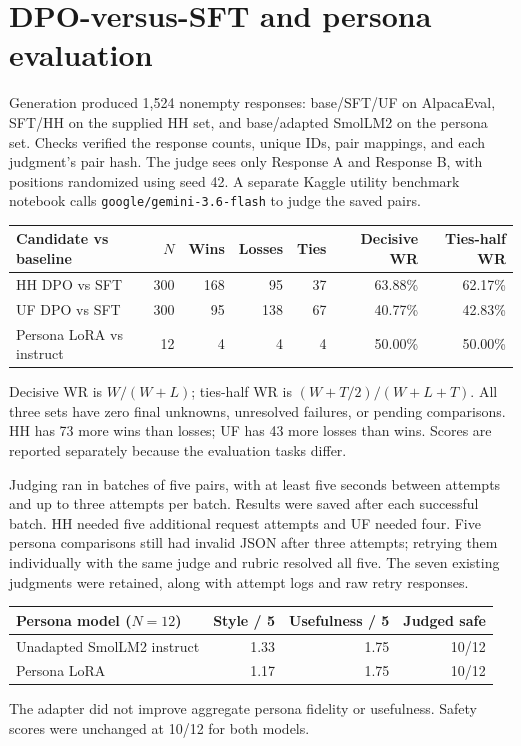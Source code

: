 \documentclass[10pt,a4paper]{article}
\begin{document}
\clearpage
\section{DPO-versus-SFT and persona evaluation}
Generation produced 1,524 nonempty responses: base/SFT/UF on AlpacaEval, SFT/HH on the supplied HH set, and base/adapted SmolLM2 on the persona set. Checks verified the response counts, unique IDs, pair mappings, and each judgment's pair hash. The judge sees only Response A and Response B, with positions randomized using seed 42. A separate Kaggle utility benchmark notebook calls \texttt{google/gemini-3.6-flash} to judge the saved pairs.

\begin{center}\small
\begin{tabular}{lrrrrrr}\toprule
Candidate vs baseline & $N$ & Wins & Losses & Ties & Decisive WR & Ties-half WR\\\midrule
HH DPO vs SFT & 300 & 168 & 95 & 37 & 63.88\% & 62.17\%\\
UF DPO vs SFT & 300 & 95 & 138 & 67 & 40.77\% & 42.83\%\\
Persona LoRA vs instruct & 12 & 4 & 4 & 4 & 50.00\% & 50.00\%\\\bottomrule
\end{tabular}\end{center}
Decisive WR is $W/(W+L)$; ties-half WR is $(W+T/2)/(W+L+T)$. All three sets have zero final unknowns, unresolved failures, or pending comparisons. HH has 73 more wins than losses; UF has 43 more losses than wins. Scores are reported separately because the evaluation tasks differ.

Judging ran in batches of five pairs, with at least five seconds between attempts and up to three attempts per batch. Results were saved after each successful batch. HH needed five additional request attempts and UF needed four. Five persona comparisons still had invalid JSON after three attempts; retrying them individually with the same judge and rubric resolved all five. The seven existing judgments were retained, along with attempt logs and raw retry responses.

\begin{center}\small
\begin{tabular}{lrrr}\toprule
Persona model ($N=12$) & Style / 5 & Usefulness / 5 & Judged safe\\\midrule
Unadapted SmolLM2 instruct & 1.33 & 1.75 & 10/12\\
Persona LoRA & 1.17 & 1.75 & 10/12\\\bottomrule
\end{tabular}\end{center}
The adapter did not improve aggregate persona fidelity or usefulness. Safety scores were unchanged at 10/12 for both models.
\end{document}
